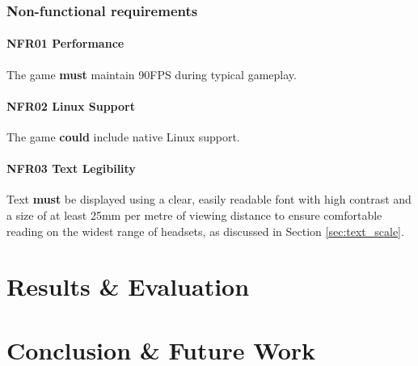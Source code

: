 \documentclass[sigconf,authordraft]{acmart}
\begin{document}
\subsubsection{Non-functional requirements}

\paragraph{NFR01 Performance}
The game \textbf{must} maintain 90FPS during typical gameplay.

\paragraph{NFR02 Linux Support}
The game \textbf{could} include native Linux support.

\paragraph{NFR03 Text Legibility}
Text \textbf{must} be displayed using a clear, easily readable font with high
contrast and a size of at least 25mm per metre of viewing distance to ensure
comfortable reading on the widest range of headsets, as discussed in Section
\ref{sec:text_scale}.

\section{Results \& Evaluation}

\section{Conclusion \& Future Work}

\begin{acks}

\end{acks}




\appendix
\end{document}
